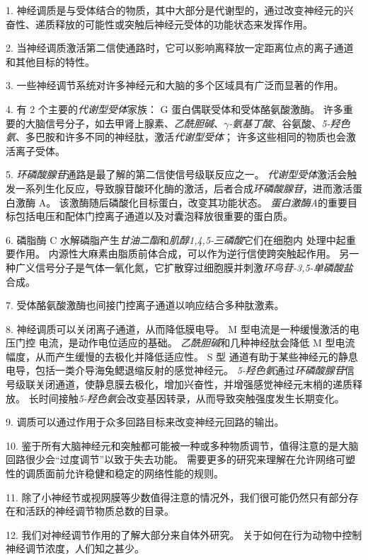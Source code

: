 1. 神经调质是与受体结合的物质，其中大部分是代谢型的，通过改变神经元的兴奋性、递质释放的可能性或突触后神经元受体的功能状态来发挥作用。


2. 当神经调质激活第二信使通路时，它可以影响离释放一定距离位点的离子通道和其他目标的特性。


3. 一些神经调节系统对许多神经元和大脑的多个区域具有广泛而显著的作用。


4. 有 2 个主要的\textit{代谢型受体}家族：
G 蛋白偶联受体和受体酪氨酸激酶。 
许多重要的大脑信号分子，如去甲肾上腺素、\textit{乙酰胆碱}、\textit{$\gamma$-氨基丁酸}、谷氨酸、\textit{5-羟色氨}、多巴胺和许多不同的神经肽，激活\textit{代谢型受体}；
许多这些相同的物质也会激活离子受体。 


5. \textit{环磷酸腺苷}通路是最了解的第二信使信号级联反应之一。
\textit{代谢型受体}激活会触发一系列生化反应，导致腺苷酸环化酶的激活，后者合成\textit{环磷酸腺苷}，进而激活蛋白激酶 A。
该激酶随后磷酸化目标蛋白，改变其功能状态。
\textit{蛋白激酶A}的重要目标包括电压和配体门控离子通道以及对囊泡释放很重要的蛋白质。 


6. 磷脂酶 C 水解磷脂产生\textit{甘油二酯}和\textit{肌醇1,4,5-三磷酸}它们在细胞内  处理中起重要作用。
内源性大麻素由脂质前体合成，可以作为逆行信使跨突触起作用。
另一种广义信号分子是气体一氧化氮，它扩散穿过细胞膜并刺激\textit{环鸟苷-3,5-单磷酸盐}合成。


7. 受体酪氨酸激酶也间接门控离子通道以响应结合多种肽激素。 


8. 神经调质可以关闭离子通道，从而降低膜电导。
M 型电流是一种缓慢激活的电压门控  电流，是动作电位适应的基础。
\textit{乙酰胆碱}和几种神经肽会降低 M 型电流幅度，从而产生缓慢的去极化并降低适应性。
S 型  通道有助于某些神经元的静息  电导，包括一类介导海兔鳃退缩反射的感觉神经元。
\textit{5-羟色氨}通过\textit{环磷酸腺苷}信号级联关闭通道，使静息膜去极化，增加兴奋性，并增强感觉神经元末梢的递质释放。
长时间接触\textit{5-羟色氨}会改变基因转录，从而导致突触强度发生长期变化。 


9. 调质可以通过作用于众多回路目标来改变神经元回路的输出。 


10. 鉴于所有大脑神经元和突触都可能被一种或多种物质调节，值得注意的是大脑回路很少会“过度调节”以致于失去功能。
需要更多的研究来理解在允许网络可塑性的调质面前允许稳健和稳定的网络性能的规则。


11. 除了小神经节或视网膜等少数值得注意的情况外，我们很可能仍然只有部分存在和活跃的神经调节物质总数的目录。


12. 我们对神经调节作用的了解大部分来自体外研究。
关于如何在行为动物中控制神经调节浓度，人们知之甚少。





